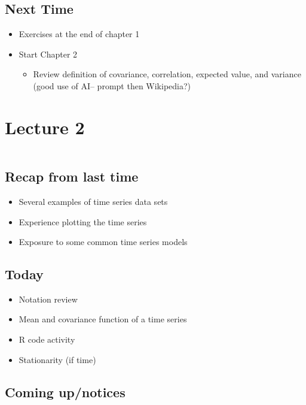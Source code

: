 \documentclass[
  letterpaper,
  DIV=11,
  numbers=noendperiod]{scrreprt}
\providecommand{\tightlist}{%
  \setlength{\itemsep}{0pt}\setlength{\parskip}{0pt}}\usepackage{longtable,booktabs,array}
\begin{document}
\section{Next Time}\label{next-time}

\begin{itemize}
\item
  Exercises at the end of chapter 1
\item
  Start Chapter 2

  \begin{itemize}
  \tightlist
  \item
    Review definition of covariance, correlation, expected value, and
    variance (good use of AI-- prompt then Wikipedia?)
  \end{itemize}
\end{itemize}

\chapter{Lecture 2}\label{lecture-2}

\[
\newcommand\E{{\mathbb{E}}}
\]

\section{Recap from last time}\label{recap-from-last-time}

\begin{itemize}
\item
  Several examples of time series data sets
\item
  Experience plotting the time series
\item
  Exposure to some common time series models
\end{itemize}

\section{Today}\label{today}

\begin{itemize}
\tightlist
\item
  Notation review
\item
  Mean and covariance function of a time series
\item
  R code activity
\item
  Stationarity (if time)
\end{itemize}

\section{Coming up/notices}\label{coming-upnotices}
\end{document}
